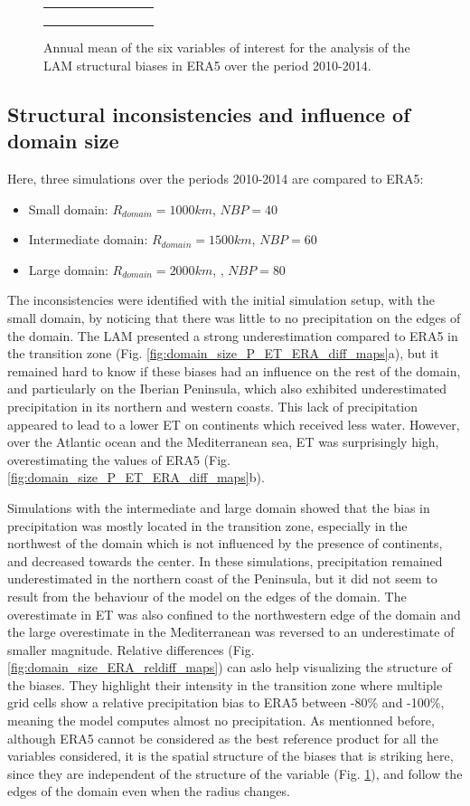 \begin{figure}[htbp]
\begin{tabular}{ccc}
\begin{subfigure}[b]{0.33\textwidth}
        \end{subfigure}
    \end{tabular}
    \caption{Annual mean of the six variables of interest for the analysis of the LAM structural biases in ERA5 over the period 2010-2014.}
    \label{fig:ERA_var_maps}
\end{figure}

\subsection{Structural inconsistencies and influence of domain size}
Here, three simulations over the periods 2010-2014 are compared to ERA5:
\begin{itemize}
    \item Small domain: $R_{domain} = 1000 km$, $NBP=40$
    \item Intermediate domain: $R_{domain} = 1500 km$, $NBP=60$
    \item Large domain: $R_{domain} = 2000 km$, , $NBP=80$
\end{itemize}

The inconsistencies were identified with the initial simulation setup, with the small domain, by noticing that there was little to no precipitation on the edges of the domain. The LAM presented a strong underestimation compared to ERA5 in the transition zone (Fig. \ref{fig:domain_size_P_ET_ERA_diff_maps}a), but it remained hard to know if these biases had an influence on the rest of the domain, and particularly on the Iberian Peninsula, which also exhibited underestimated precipitation in its northern and western coasts.
This lack of precipitation appeared to lead to a lower ET on continents which received less water. However, over the Atlantic ocean and the Mediterranean sea, ET was surprisingly high, overestimating the values of ERA5 (Fig. \ref{fig:domain_size_P_ET_ERA_diff_maps}b). 

Simulations with the intermediate and large domain showed that the bias in precipitation was mostly located in the transition zone, especially in the northwest of the domain which is not influenced by the presence of continents, and decreased towards the center. In these simulations, precipitation remained underestimated in the northern coast of the Peninsula, but it did not seem to result from the behaviour of the model on the edges of the domain.
The overestimate in ET was also confined to the northwestern edge of the domain and the large overestimate in the Mediterranean was reversed to an underestimate of smaller magnitude. Relative differences (Fig. \ref{fig:domain_size_ERA_reldiff_maps}) can aslo help visualizing the structure of the biases. They highlight their intensity in the transition zone where multiple grid cells show a relative precipitation bias to ERA5 between -80\% and -100\%, meaning the model computes almost no precipitation. 
As mentionned before, although ERA5 cannot be considered as the best reference product for all the variables considered, it is the spatial structure of the biases that is striking here, since they are independent of the structure of the variable (Fig. \ref{fig:ERA_var_maps}), and follow the edges of the domain even when the radius changes.

